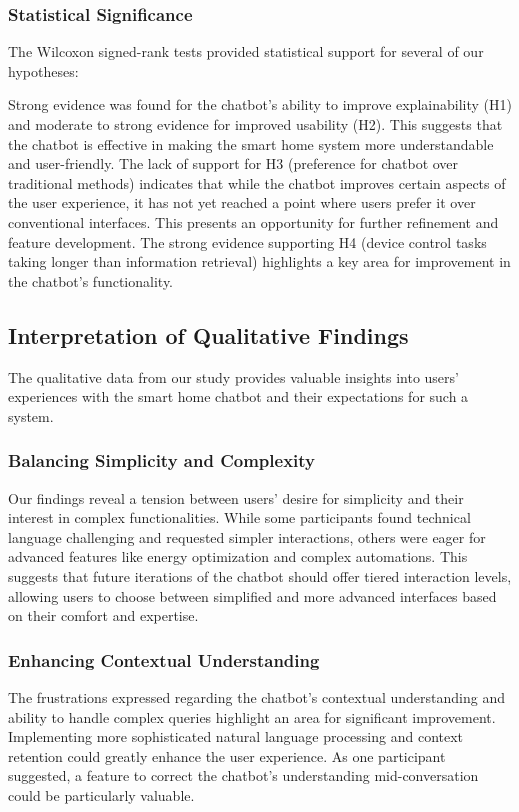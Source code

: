 \subsubsection{Statistical Significance}
The Wilcoxon signed-rank tests provided statistical support for several of our hypotheses:

Strong evidence was found for the chatbot's ability to improve explainability (H1) and moderate to strong evidence for improved usability (H2). This suggests that the chatbot is effective in making the smart home system more understandable and user-friendly.
The lack of support for H3 (preference for chatbot over traditional methods) indicates that while the chatbot improves certain aspects of the user experience, it has not yet reached a point where users prefer it over conventional interfaces. This presents an opportunity for further refinement and feature development.
The strong evidence supporting H4 (device control tasks taking longer than information retrieval) highlights a key area for improvement in the chatbot's functionality.

\subsection{Interpretation of Qualitative Findings}
The qualitative data from our study provides valuable insights into users' experiences with the smart home chatbot and their expectations for such a system.
\subsubsection{Balancing Simplicity and Complexity}
Our findings reveal a tension between users' desire for simplicity and their interest in complex functionalities. While some participants found technical language challenging and requested simpler interactions, others were eager for advanced features like energy optimization and complex automations. This suggests that future iterations of the chatbot should offer tiered interaction levels, allowing users to choose between simplified and more advanced interfaces based on their comfort and expertise.
\subsubsection{Enhancing Contextual Understanding}
The frustrations expressed regarding the chatbot's contextual understanding and ability to handle complex queries highlight an area for significant improvement. Implementing more sophisticated natural language processing and context retention could greatly enhance the user experience. As one participant suggested, a feature to correct the chatbot's understanding mid-conversation could be particularly valuable.
